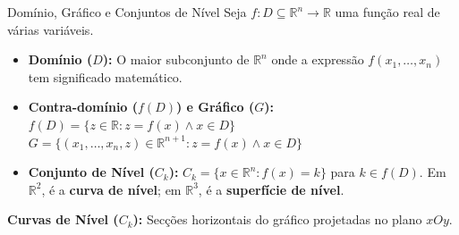 \documentclass[11pt,a4paper]{article}
\newcommand{\R}{\mathbb{R}}
\begin{document}
\noindent\begin{minipage}[t]{0.65\textwidth}
  \begin{definitionbox}{Domínio, Gráfico e Conjuntos de Nível}
    Seja $f: D \subseteq \R^n \to \R$ uma função real de várias variáveis.
    \begin{itemize}
      \item \textbf{Domínio ($D$):} O maior subconjunto de $\R^n$ onde a expressão $f(x_1, \dots, x_n)$ tem significado matemático.
      \item \textbf{Contra-domínio ($f(D)$) e Gráfico ($G$):} \\
        $f(D) = \{z \in \R : z = f(x) \wedge x \in D\}$ \\
        $G = \{(x_1, \dots, x_n, z) \in \R^{n+1} : z = f(x) \wedge x \in D\}$
      \item \textbf{Conjunto de Nível ($C_k$):} $C_k = \{x \in \R^n : f(x) = k\}$ para $k \in f(D)$. Em $\R^2$, é a \textbf{curva de nível}; em $\R^3$, é a \textbf{superfície de nível}.
    \end{itemize}
  \end{definitionbox}
\end{minipage}%
\hfill
\begin{minipage}[t]{0.33\textwidth}
  \centering
  \vspace{8pt}
  \vspace{4pt}
  \begin{center}
    \small \textbf{Curvas de Nível ($C_k$):} Secções horizontais do gráfico projetadas no plano $xOy$.
  \end{center}
\end{minipage}
\end{document}
